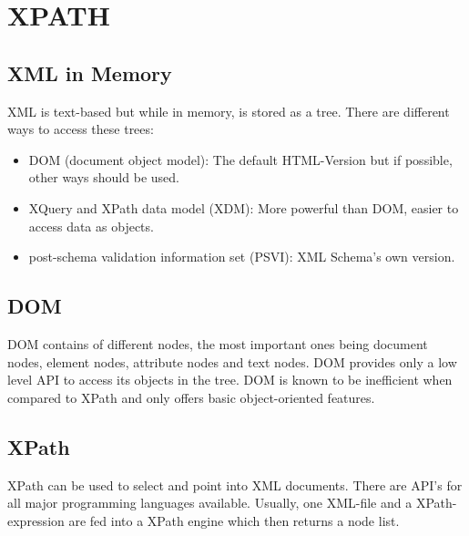 \chapter{XPATH}
\section{XML in Memory}
XML is text-based but while in memory, is stored as a tree. There are different ways to access these trees:
\begin{itemize}
	\item DOM (document object model):
	The default HTML-Version but if possible, other ways should be used.
	\item XQuery and XPath data model (XDM):
	More powerful than DOM, easier to access data as objects.
	\item post-schema validation information set (PSVI):
	XML Schema's own version.
\end{itemize}

\section{DOM}
DOM contains of different nodes, the most important ones being document nodes, element nodes, attribute nodes and text nodes.
DOM provides only a low level API to access its objects in the tree. DOM is known to be inefficient when compared to XPath and only offers basic object-oriented features.

\section{XPath}
XPath can be used to select and point into XML documents. There are API's for all major programming languages available.
Usually, one XML-file and a XPath-expression are fed into a XPath engine which then returns a node list.
